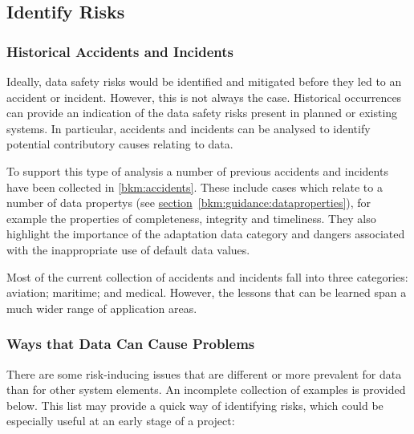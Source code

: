 \subsection{Identify Risks}
\subsubsection{Historical Accidents and Incidents}
Ideally, data safety risks would be identified and mitigated before they led to an accident or incident. However, this is not always the case. Historical occurrences can provide an indication of the data safety risks present in planned or existing systems. In particular, accidents and incidents can be analysed to identify potential contributory causes relating to data.

To support this type of analysis a number of previous accidents and incidents have been collected in \autoref{bkm:accidents}.
These include cases which relate to a number of \glspl{data property} (see
\hyperref[bkm:guidance:dataproperties]{section}~\ref{bkm:guidance:dataproperties}), %
for example the properties of \gls{completeness}, \gls{integrity} and \gls{timeliness}.
They also highlight the importance of the \gls{adaptation data} category and dangers associated with the inappropriate use of default data values.

Most of the current collection of accidents and incidents fall into three categories: aviation; maritime; and medical. However, the lessons that can be learned span a much wider range of application areas.

\subsubsection{Ways that Data Can Cause Problems}
\label{tab:issues}
There are some risk-inducing issues that are different or more prevalent for data than for other system elements. An incomplete collection of examples is provided below. This list may provide a quick way of identifying risks, which could be especially useful at an early stage of a project:

